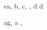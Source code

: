 \begin{eqcode}{e}{a, b, c}{, , }{}
  d \in {} \lend
  d \gets {} \lend 
\end{eqcode}

\begin{eqcode}{a}{g, a }{, }{}
  
\end{eqcode}

